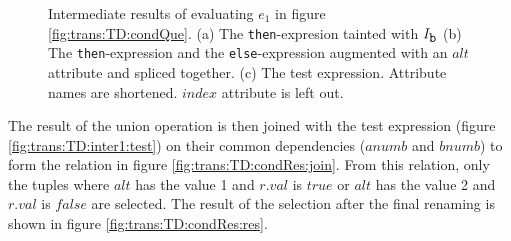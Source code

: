 \begin{myExample}
\begin{figure}[h]
\centering
{}
\phantom{A}
\phantom{A}
\caption[Intermediate results of evaluating $e_1$ in figure \ref{fig:trans:TD:condQue}.]{Intermediate results of
evaluating $e_1$ in figure \ref{fig:trans:TD:condQue}. (a) The \texttt{then}-expresion tainted with $I_{\mbox{\texttt{b}}}$ (b) The \texttt{then}-expression and the
\texttt{else}-expression augmented with an $alt$ attribute and spliced together. (c) The test expression.
Attribute names are shortened. $index$ attribute is left out. \label{fig:trans:TD:inter1}}
\end{figure}

The result of the \textsf{union} operation is then joined with the test expression (figure
\ref{fig:trans:TD:inter1:test}) on their common dependencies ($anumb$ and $bnumb$) to form the relation in figure
\ref{fig:trans:TD:condRes:join}. From this relation, only the tuples where $alt$ has the value 1 and $r.val$ is
$true$ or $alt$ has the value 2 and $r.val$ is $false$ are selected. The result of the selection after the final
renaming is shown in figure \ref{fig:trans:TD:condRes:res}.


\end{myExample}
